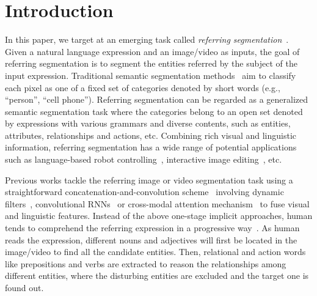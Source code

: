 \documentclass[10pt,journal,cspaper,compsoc]{IEEEtran}
\begin{document}
\IEEEdisplaynotcompsoctitleabstractindextext

\IEEEpeerreviewmaketitle


\section{Introduction}

In this paper, we target at an emerging task called \textit{referring segmentation}~\cite{hu2016segmentation}\cite{li2018referring}\cite{chen2019see}. 
Given a natural language expression and an image/video as inputs, the goal of referring segmentation is to segment the entities referred by the subject of the input expression. 
Traditional semantic segmentation methods~\cite{chen2017deeplab}\cite{zhao2017pyramid}\cite{fu2019dual} aim to classify each pixel as one of a fixed set of categories denoted by short words (e.g., ``person'', ``cell phone''). 
Referring segmentation can be regarded as a generalized semantic segmentation task where the categories belong to an open set denoted by expressions with various grammars and diverse contents, such as entities, attributes, relationships and actions, etc. 
Combining rich visual and linguistic information, referring segmentation has a wide range of potential applications such as language-based robot controlling~\cite{wang2019reinforced}\cite{gao2021room}, interactive image editing~\cite{chen2018language}, etc.

Previous works tackle the referring image or video segmentation task using a straightforward concatenation-and-convolution scheme~\cite{hu2016segmentation} involving dynamic filters~\cite{margffoy2018dynamic}\cite{gavrilyuk2018actor}, convolutional RNNs~\cite{liu2017recurrent}\cite{li2018referring} or cross-modal attention mechanism~\cite{shi2018key}\cite{chen2019see}\cite{ye2019cross}\cite{wang2019asymmetric} to fuse visual and linguistic features. 
Instead of the above one-stage implicit approaches, human tends to comprehend the referring expression in a progressive way~\cite{tanenhaus1995integration}. 
As human reads the expression, different nouns and adjectives will first be located in the image/video to find all the candidate entities. Then, relational and action words like prepositions and verbs are extracted to reason the relationships among different entities, where the disturbing entities are excluded and the target one is found out.
\end{document}
